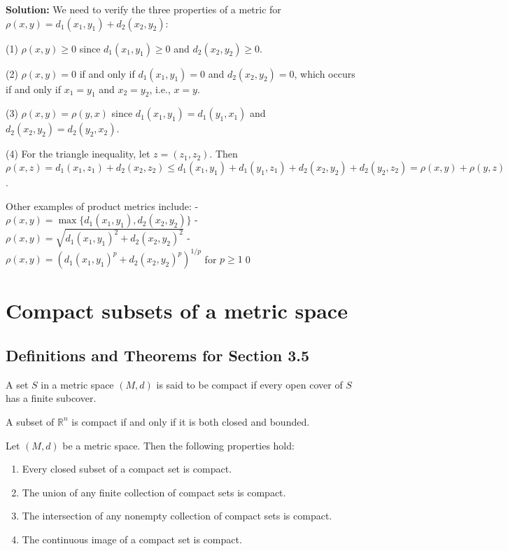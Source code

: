 \bigskip\noindent\textbf{Solution:} We need to verify the three properties of a metric for $\rho(x,y) = d_1(x_1,y_1) + d_2(x_2,y_2)$:

(1) $\rho(x,y) \geq 0$ since $d_1(x_1,y_1) \geq 0$ and $d_2(x_2,y_2) \geq 0$.

(2) $\rho(x,y) = 0$ if and only if $d_1(x_1,y_1) = 0$ and $d_2(x_2,y_2) = 0$, which occurs if and only if $x_1 = y_1$ and $x_2 = y_2$, i.e., $x = y$.

(3) $\rho(x,y) = \rho(y,x)$ since $d_1(x_1,y_1) = d_1(y_1,x_1)$ and $d_2(x_2,y_2) = d_2(y_2,x_2)$.

(4) For the triangle inequality, let $z = (z_1,z_2)$. Then $\rho(x,z) = d_1(x_1,z_1) + d_2(x_2,z_2) \leq d_1(x_1,y_1) + d_1(y_1,z_1) + d_2(x_2,y_2) + d_2(y_2,z_2) = \rho(x,y) + \rho(y,z)$.

Other examples of product metrics include:
- $\rho(x,y) = \max\{d_1(x_1,y_1), d_2(x_2,y_2)\}$
- $\rho(x,y) = \sqrt{d_1(x_1,y_1)^2 + d_2(x_2,y_2)^2}$
- $\rho(x,y) = (d_1(x_1,y_1)^p + d_2(x_2,y_2)^p)^{1/p}$ for $p \geq 1$\qed
\section{Compact subsets of a metric space}

\subsection*{Definitions and Theorems for Section 3.5}

\begin{definition}
A set $S$ in a metric space $(M,d)$ is said to be compact if every open cover of $S$ has a finite subcover.
\end{definition}

\begin{theorem}
A subset of $\mathbb{R}^n$ is compact if and only if it is both closed and bounded.
\end{theorem}

\begin{theorem}
Let $(M,d)$ be a metric space. Then the following properties hold:
\begin{enumerate}
\item Every closed subset of a compact set is compact.
\item The union of any finite collection of compact sets is compact.
\item The intersection of any nonempty collection of compact sets is compact.
\item The continuous image of a compact set is compact.
\end{enumerate}
\end{theorem}

